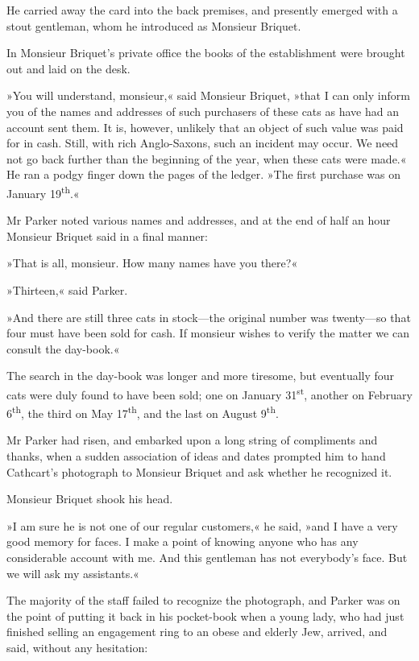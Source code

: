 He carried away the card into the back premises, and presently emerged with a stout gentleman, whom he introduced as Monsieur Briquet.

In Monsieur Briquet's private office the books of the establishment were brought out and laid on the desk.

»You will understand, monsieur,« said Monsieur Briquet, »that I can only inform you of the names and addresses of such purchasers of these cats as have had an account sent them. It is, however, unlikely that an object of such value was paid for in cash. Still, with rich Anglo-Saxons, such an incident may occur. We need not go back further than the beginning of the year, when these cats were made.« He ran a podgy finger down the pages of the ledger. »The first purchase was on January 19\textsuperscript{th}.«

Mr Parker noted various names and addresses, and at the end of half an hour Monsieur Briquet said in a final manner:

»That is all, monsieur. How many names have you there?«

»Thirteen,« said Parker.

»And there are still three cats in stock—the original number was twenty—so that four must have been sold for cash. If monsieur wishes to verify the matter we can consult the day-book.«

The search in the day-book was longer and more tiresome, but eventually four cats were duly found to have been sold; one on January 31\textsuperscript{st}, another on February 6\textsuperscript{th}, the third on May 17\textsuperscript{th}, and the last on August 9\textsuperscript{th}.

Mr Parker had risen, and embarked upon a long string of compliments and thanks, when a sudden association of ideas and dates prompted him to hand Cathcart's photograph to Monsieur Briquet and ask whether he recognized it.

Monsieur Briquet shook his head.

»I am sure he is not one of our regular customers,« he said, »and I have a very good memory for faces. I make a point of knowing anyone who has any considerable account with me. And this gentleman has not everybody's face. But we will ask my assistants.«

The majority of the staff failed to recognize the photograph, and Parker was on the point of putting it back in his pocket-book when a young lady, who had just finished selling an engagement ring to an obese and elderly Jew, arrived, and said, without any hesitation:

